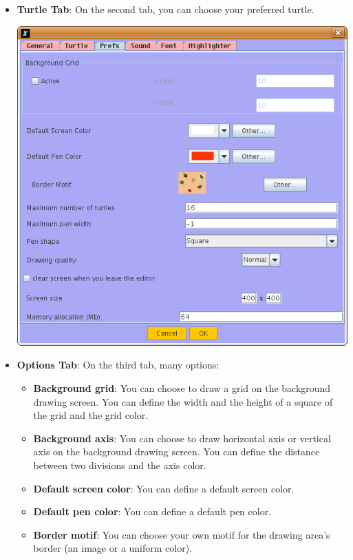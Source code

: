 \begin{itemize}
\begin{itemize}
\begin{center}
	\end{center}
	\vspace{0.25cm}
\item \textbf{Turtle Tab}: On the second tab, you can choose your preferred turtle.
	\begin{center}
 		\includegraphics[scale=0.4]{pics/interface-CapturePref3.png}
	\end{center}
\item \textbf{Options Tab}: On the third tab, many options:\\
	\begin{itemize}
	\item \textbf{Background grid}: You can choose to draw a grid on the background drawing screen. You can define the width and the height of a square of the grid and the grid color.
	\item \textbf{Background axis}: You can choose to draw horizontal axis or vertical axis on the background drawing screen. You can define the distance between two divisions and the axis color.
	\item \textbf{Default screen color}: You can define a default screen color.
	\item \textbf{Default pen color}: You can define a default pen color.
	\item \textbf{Border motif}: You can choose your own motif for the drawing area's border (an image or a uniform color).

\end{itemize}
\end{itemize}
\end{itemize}
